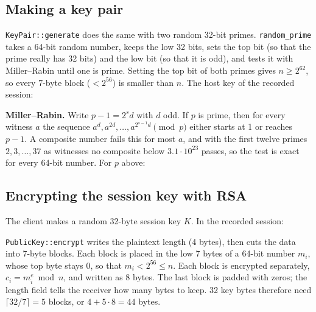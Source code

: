 \subsection{Making a key pair}
\label{sec:hostkey}

\texttt{KeyPair::generate} does the same with two random 32-bit primes.
\texttt{random\_prime} takes a 64-bit random number, keeps the low 32 bits,
sets the top bit (so that the prime really has 32 bits) and the low bit (so
that it is odd), and tests it with Miller--Rabin until one is prime. Setting the
top bit of both primes gives $n \geq 2^{62}$, so every 7-byte block
($< 2^{56}$) is smaller than $n$. The host key of the recorded session:

\begin{table}[H]
\centering
\small

\caption{The host key of the recorded session, made by the same steps as \texttt{KeyPair::generate}.}
\label{tab:hostkey}
\end{table}

\textbf{Miller--Rabin.} Write $p - 1 = 2^{s} d$ with $d$ odd. If $p$ is prime,
then for every witness $a$ the sequence $a^{d}, a^{2d}, \ldots, a^{2^{s-1}d}
\pmod p$ either starts at 1 or reaches $p - 1$. A composite number fails this
for most $a$, and with the first twelve primes $2, 3, \ldots, 37$ as witnesses no composite
below $3.1 \cdot 10^{23}$ passes, so the test is exact for every 64-bit number. For $p$ above:

\begin{table}[H]
\centering
\small

\caption{The first three of the twelve Miller--Rabin witnesses for $p$.}
\end{table}

\subsection{Encrypting the session key with RSA}
\label{sec:rsablocks}

The client makes a random 32-byte session key $K$. In the recorded session:
\begin{center}

\end{center}
\texttt{PublicKey::encrypt} writes the plaintext length (4 bytes), then cuts the
data into 7-byte blocks. Each block is placed in the low 7 bytes of a 64-bit
number $m_i$, whose top byte stays 0, so that $m_i < 2^{56} \leq n$. Each block
is encrypted separately, $c_i = m_i^{e} \bmod n$, and written as 8 bytes. The
last block is padded with zeros; the length field tells the receiver how many
bytes to keep. 32 key bytes therefore need $\lceil 32/7 \rceil = 5$ blocks, or
$4 + 5 \cdot 8 = 44$ bytes.

